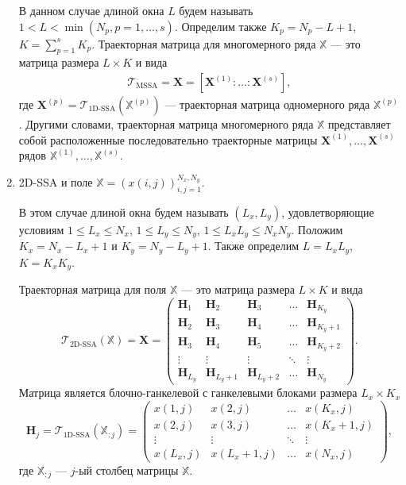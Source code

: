\documentclass[specialist,
               substylefile = spbu.rtx,
               subf,href,colorlinks=true, 12pt]{disser}
\begin{document}
\begin{enumerate}
 В данном случае длиной окна $L$ будем называть $1< L < \min(N_p,p=1,\ldots,s)$. Определим также $K_p = N_p - L + 1$, $K = \sum_{p=1}^{s} K_p$. Траекторная матрица для многомерного ряда $\mathbb{X}$ --- это матрица размера $L \times K$ и вида
\begin{gather*}
\mathcal{T}_{\text{MSSA}} = \mathbf{X} = \left[ \mathbf{X}^{(1)}: \ldots :  \mathbf{X}^{(s)}  \right],
\end{gather*} 
где $\mathbf{X}^{(p)}= \mathcal{T}_{\text{1D-SSA}} \left(\mathbb{X}^{(p)} \right)$ --- траекторная матрица одномерного ряда $\mathbb{X}^{(p)}$. 
Другими словами, траекторная матрица многомерного ряда $\mathbb{X}$ представляет собой расположенные последовательно траекторные матрицы $\mathbf{X}^{(1)},\ldots, \mathbf{X}^{(s)}$ рядов $\mathbb{X}^{(1)}, \ldots, \mathbb{X}^{(s)}$.

\item 2D-SSA и поле $\mathbb{X}= \left(x(i,j) \right)_{i,j=1}^{N_x,N_y}$.

В этом случае длиной окна будем называть $(L_x, L_y)$, удовлетворяющие условиям $1 \leqslant L_x \leqslant N_x$, $1 \leqslant L_y \leqslant N_y$, $1 \leqslant L_x L_y \leqslant N_x N_y$. Положим $K_x = N_x - L_x + 1$ и $K_y = N_y - L_y + 1$. Также определим $L = L_x L_y$, $K = K_x K_y$.

Траекторная матрица для поля $\mathbb{X}$ --- это матрица размера $L \times K$ и вида 
\begin{equation*}
\mathcal{T}_{\text{2D-SSA}}(\mathbb{X}) = \mathbf{X}= \begin{pmatrix}
			\mathbf{H}_1 & \mathbf{H}_2 & \mathbf{H}_3 & \ldots & \mathbf{H}_{K_y} \\
			\mathbf{H}_2 & \mathbf{H}_3 & \mathbf{H}_4 & \ldots & \mathbf{H}_{K_y+1} \\
			\mathbf{H}_3 & \mathbf{H}_4 & \mathbf{H}_5 & \ldots & \mathbf{H}_{K_y+2} \\
			\vdots &\vdots & \vdots & \ddots & \vdots \\
			\mathbf{H}_{L_y} & \mathbf{H}_{L_y+1} & \mathbf{H}_{L_y+2} & \ldots & \mathbf{H}_{N_y}  
			\end{pmatrix}.
\end{equation*}
Матрица является блочно-ганкелевой с ганкелевыми блоками размера $L_x \times K_x$
\begin{equation*}
\mathbf{H}_j = \mathcal{T}_{\text{1D-SSA}}(\mathbb{X}_{:j})  = \begin{pmatrix}
			x(1,j) & x(2,j) & \ldots & x(K_x, j) \\
			x(2,j) & x(3,j) & \ldots & x(K_x+1, j) \\
			\vdots  & \vdots & \ddots & \vdots \\
			x(L_x, j) & x(L_x+1, j) & \ldots & x(N_x, j)  
			\end{pmatrix},
\end{equation*}
где $\mathbb{X}_{:j}$ --- $j$-ый столбец матрицы $\mathbb{X}$.
\end{enumerate}
\end{document}
